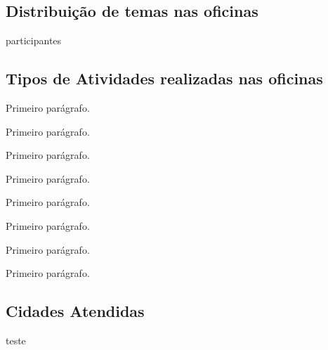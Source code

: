 \documentclass[
12pt,		%
openright,	%
twoside,  %
a4paper,			%
chapter=TITLE,		%
english,			%
french,				%
spanish,			%
brazil				%
]{USPSC-classe/USPSC_RedarTex}
\begin{document}
\subsection[Distribui\c{c}\~ao de temas nas oficinas]{Distribui\c{c}\~ao de temas nas oficinas}\label{Distribui\c{c}\~ao de temas nas oficinas}
participantes








\subsection[Tipos de Atividades realizadas nas oficinas]{Tipos de Atividades realizadas nas oficinas}\label{Tipos de Atividades realizadas nas oficinas}
Primeiro par\'agrafo.








Primeiro par\'agrafo.








Primeiro par\'agrafo.








Primeiro par\'agrafo.








Primeiro par\'agrafo.








Primeiro par\'agrafo.








Primeiro par\'agrafo.








Primeiro par\'agrafo.








\subsection[Cidades Atendidas]{Cidades Atendidas}\label{Cidades Atendidas}
teste
\end{document}
